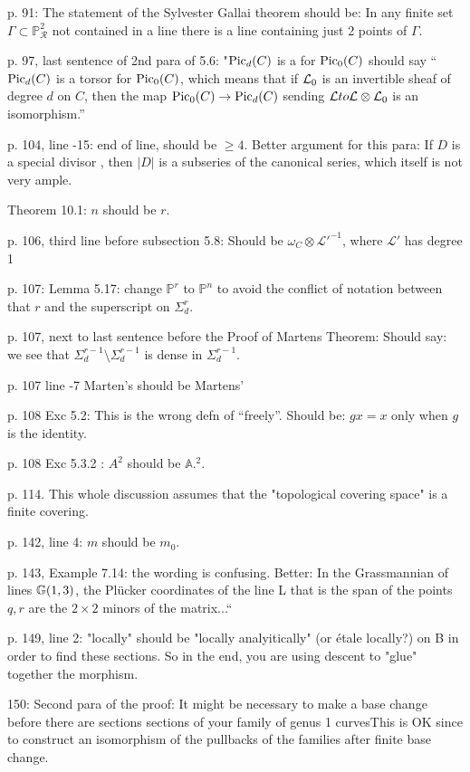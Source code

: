 \documentclass[twoside,12pt, leqno]{amsart}
\def\PP{{\mathbb P}}
\def\RR{{\mathcal R}}
\begin{document}
p. 91: The statement of the Sylvester Gallai theorem should be:
In any finite set $\Gamma\subset \PP^2_\RR$ not contained in a line
there is a line containing just 2 points of $\Gamma$.

p. 97, last sentence of 2nd para of 5.6: "$\operatorname{Pic}_d(C)$ is a for $\operatorname{Pic}_0(C)$ should say
``$\operatorname{Pic}_d(C)$ is a torsor for $\operatorname{Pic}_0(C)$, which means that if ${\mathcal L}_0$ is an invertible sheaf of
degree $d$ on $C$, then the map $\operatorname{Pic}_0(C)\to \operatorname{Pic}_d(C)$ sending ${\mathcal L} to {\mathcal L}\otimes {\mathcal L}_0$
is an isomorphism.''

p. 104, line -15: end of line, should be $\geq 4$. Better argument for this para: If $D$ is a special divisor ,
then $|D|$ is a subseries of the canonical series, which itself is not very ample.

Theorem 10.1: $n$ should be $r$.

p. 106, third line before subsection 5.8: Should be $\omega_C \otimes \mathcal L'^{-1}$, where $\mathcal L'$ has degree 1

p. 107: Lemma 5.17: change $\PP^r$ to $\PP^n$ to avoid the conflict of notation between that $r$ and
the superscript on $\Sigma^r_d$. 

p. 107, next to last sentence before the Proof of Martens Theorem: Should say: we see that
$\Sigma^{r-1}_d \setminus \Sigma^{r-1}_d$ is dense in $\Sigma^{r-1}_d$.


p. 107 line -7 Marten's should be Martens'

p. 108 Exc 5.2: This is the wrong defn of ``freely''. Should be: $gx = x$ only when $g$
is the identity.

p. 108 Exc 5.3.2 : $A^2$ should be $\mathbb A.^2$.

p. 114. This whole discussion assumes that the "topological covering space" is a finite covering.

p. 142, line 4: $m$ should be $m_{0}$.

p. 143, Example 7.14: the wording is confusing. Better: 
In the Grassmannian of lines ${\mathbb G}(1,3)$, the Pl\"ucker coordinates of the line L that is the span of the points $q,r$ 
are the $2\times 2$ minors of the matrix...``

p. 149, line 2: "locally" should be "locally analyitically" (or \'etale locally?) on B in order to find these sections. So in the end, you are using descent to "glue" together the morphism. 

150: Second para of the proof: It might be necessary to make a base change before there are sections sections of your family of genus 1 curvesThis is OK  since to construct an isomorphism of the pullbacks of the families after finite base change.
\end{document}
